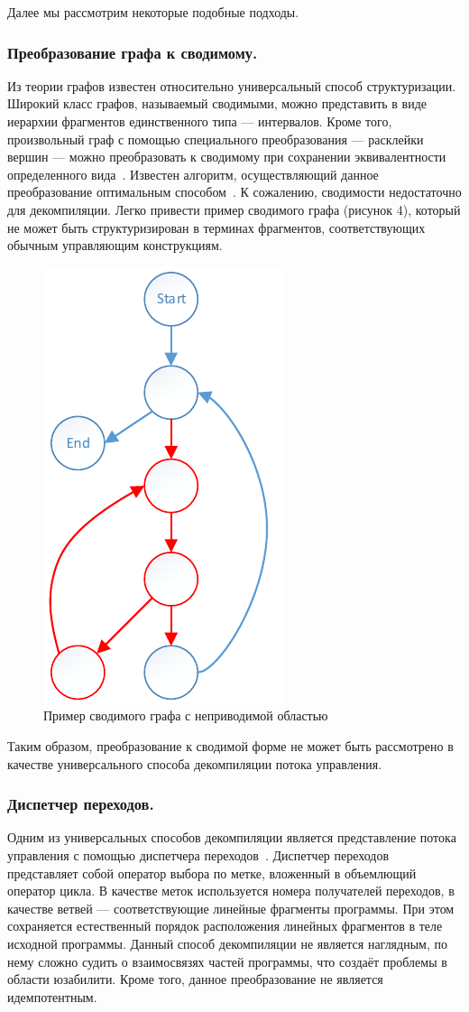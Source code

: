 Далее мы рассмотрим некоторые подобные подходы.

\subsubsection*{Преобразование графа к сводимому.}
Из теории графов известен относительно универсальный способ структуризации. Широкий класс графов, называемый сводимыми, можно представить в виде иерархии фрагментов единственного типа --- интервалов. Кроме того, произвольный граф с помощью специального преобразования --- расклейки вершин --- можно преобразовать к сводимому при сохранении эквивалентности определенного вида~\cite{hecht}. Известен алгоритм, осуществляющий данное преобразование оптимальным способом~\cite{kasyanov}. К сожалению, сводимости недостаточно для декомпиляции. Легко привести пример сводимого графа (рисунок 4), который не может быть структуризирован в терминах фрагментов, соответствующих обычным управляющим конструкциям.  

\begin{figure}
\centering \includegraphics[width=0.3\linewidth]{Zabransky/graph.pdf}
\caption{Пример сводимого графа с неприводимой областью}
\end{figure}

Таким образом, преобразование к сводимой форме не может быть рассмотрено в качестве универсального способа декомпиляции потока управления.

\subsubsection*{Диспетчер переходов.}
Одним из универсальных способов декомпиляции является представление потока управления с помощью диспетчера переходов~\cite{pliss}. Диспетчер переходов представляет собой оператор выбора по метке, вложенный в объемлющий оператор цикла. В качестве меток используется номера получателей переходов, в качестве ветвей --- соответствующие линейные фрагменты программы. При этом сохраняется естественный порядок расположения линейных фрагментов в теле исходной программы. Данный способ декомпиляции не является наглядным, по нему сложно судить о взаимосвязях частей программы, что создаёт проблемы в области юзабилити. Кроме того, данное преобразование не является идемпотентным.

